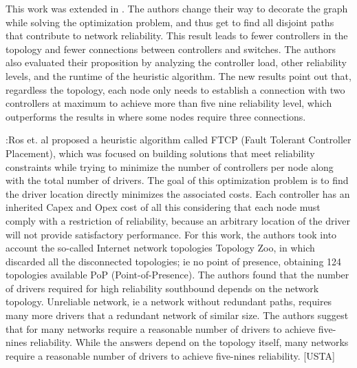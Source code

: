 \documentclass[a4paper,10pt]{article}
\begin{document}
This work was extended in \cite{RoRu16}. The authors change their way to decorate the graph while solving the optimization problem, and thus get to find all disjoint paths that contribute to network reliability. This result leads to fewer controllers in the topology and fewer connections between controllers and switches. The authors also evaluated their proposition by analyzing the controller load, other reliability levels, and the runtime of the heuristic algorithm. The new results point out that, regardless the topology, each node only needs to establish a connection with two controllers at maximum to achieve more than five nine reliability level, which outperforms the results in \cite{RoRu14} where some nodes require three connections. 



\cite{RoRu14}:Ros et. al proposed a heuristic algorithm called FTCP (Fault Tolerant Controller Placement), which was focused on building solutions that meet reliability constraints while trying to minimize the number of controllers per node along with the total number of drivers. The goal of this optimization problem is to find the driver location directly minimizes the associated costs. Each controller has an inherited Capex and Opex cost of all this considering that each node must comply with a restriction of reliability, because an arbitrary location of the driver will not provide satisfactory performance. For this work, the authors took into account the so-called Internet network topologies Topology Zoo, in which discarded all the disconnected topologies; ie no point of presence, obtaining 124 topologies available PoP (Point-of-Presence). The authors found that the number of drivers required for high reliability southbound depends on the network topology. Unreliable network, ie a network without redundant paths, requires many more drivers that a redundant network of similar size. The authors suggest that for many networks require a reasonable number of drivers to achieve five-nines reliability. While the answers depend on the topology itself, many networks require a reasonable number of drivers to achieve five-nines reliability. [USTA]
\end{document}
